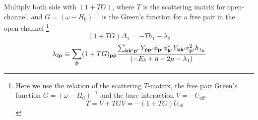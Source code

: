 Multiply both side with $(1+TG)$,  where $T$ is the scattering matrix for open-channel, and $G=(\omega-H_{0})^{-1}$ is the Green's function for a free pair in the open-channel
\footnote{Here we use the relation of the scattering $T$-matrix, the free pair Green's function $G=(\omega-H_{0})^{-1}$ and the bare interaction $V=-U_{\text{eff}}$.
\begin{equation*}
T=V+TGV=-(1+TG)U_{\text{eff}}
\end{equation*}
 }
\begin{equation*}
(1+TG)\Delta_{1}=-Th_{1}-\lambda_{2}
\end{equation*}
\begin{equation}\label{eq:pathInt2:lambda2}
\lambda_{2\mathbf{p}}\equiv\sum_{\tilde{\mathbf{p}}}(1+TG)_{\mathbf{p}\tilde{\mathbf{p}}}\frac{\sum_{\mathbf{k}\mathbf{k}{'}\mathbf{p}'} Y_{\tilde{\mathbf{p}}\mathbf{p}'}{\phi_{\mathbf{p}'}}{\phi_{\mathbf{k}'}^{*}}{Y_{\mathbf{k}\mathbf{k}'}}v_{\mathbf{p}'}^{2}{h_{1_{\mathbf{k}}}}}
		{\left(-E_{b}+\eta-2\mu-\lambda_{1}\right)}{}
\end{equation}

